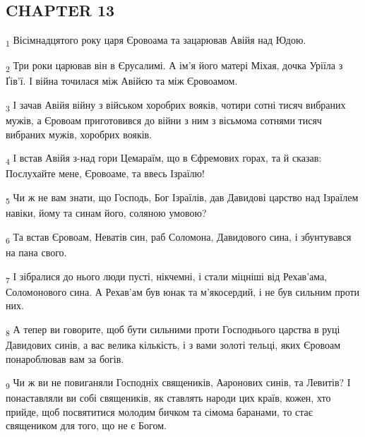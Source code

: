 \subsection{CHAPTER 13}
\begin{tcolorbox}
\textsubscript{1} Вісімнадцятого року царя Єровоама та зацарював Авійя над Юдою.
\end{tcolorbox}
\begin{tcolorbox}
\textsubscript{2} Три роки царював він в Єрусалимі. А ім'я його матері Міхая, дочка Уріїла з Ґів'ї. І війна точилася між Авійєю та між Єровоамом.
\end{tcolorbox}
\begin{tcolorbox}
\textsubscript{3} І зачав Авійя війну з військом хоробрих вояків, чотири сотні тисяч вибраних мужів, а Єровоам приготовився до війни з ним з вісьмома сотнями тисяч вибраних мужів, хоробрих вояків.
\end{tcolorbox}
\begin{tcolorbox}
\textsubscript{4} І встав Авійя з-над гори Цемараїм, що в Єфремових горах, та й сказав: Послухайте мене, Єровоаме, та ввесь Ізраїлю!
\end{tcolorbox}
\begin{tcolorbox}
\textsubscript{5} Чи ж не вам знати, що Господь, Бог Ізраїлів, дав Давидові царство над Ізраїлем навіки, йому та синам його, соляною умовою?
\end{tcolorbox}
\begin{tcolorbox}
\textsubscript{6} Та встав Єровоам, Неватів син, раб Соломона, Давидового сина, і збунтувався на пана свого.
\end{tcolorbox}
\begin{tcolorbox}
\textsubscript{7} І зібралися до нього люди пусті, нікчемні, і стали міцніші від Рехав'ама, Соломонового сина. А Рехав'ам був юнак та м'якосердий, і не був сильним проти них.
\end{tcolorbox}
\begin{tcolorbox}
\textsubscript{8} А тепер ви говорите, щоб бути сильними проти Господнього царства в руці Давидових синів, а вас велика кількість, і з вами золоті тельці, яких Єровоам понароблював вам за богів.
\end{tcolorbox}
\begin{tcolorbox}
\textsubscript{9} Чи ж ви не повиганяли Господніх священиків, Ааронових синів, та Левитів? І понаставляли ви собі священиків, як ставлять народи цих країв, кожен, хто прийде, щоб посвятитися молодим бичком та сімома баранами, то стає священиком для того, що не є Богом.
\end{tcolorbox}
